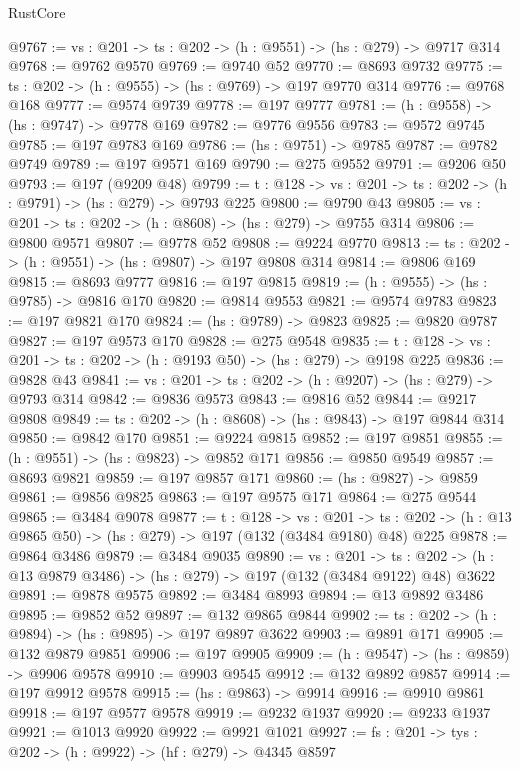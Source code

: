 \begin{lexlean}{RustCore}
\begin{coremodule}
@9767 := {vs : @201} -> {ts : @202} -> (h : @9551) -> (hs : @279) -> @9717 @314
@9768 := @9762 @9570
@9769 := @9740 @52
@9770 := @8693 @9732
@9775 := {ts : @202} -> (h : @9555) -> (hs : @9769) -> @197 @9770 @314
@9776 := @9768 @168
@9777 := @9574 @9739
@9778 := @197 @9777
@9781 := (h : @9558) -> (hs : @9747) -> @9778 @169
@9782 := @9776 @9556
@9783 := @9572 @9745
@9785 := @197 @9783 @169
@9786 := (hs : @9751) -> @9785
@9787 := @9782 @9749
@9789 := @197 @9571 @169
@9790 := @275 @9552
@9791 := @9206 @50
@9793 := @197 (@9209 @48)
@9799 := {t : @128} -> {vs : @201} -> {ts : @202} -> (h : @9791) -> (hs : @279) -> @9793 @225
@9800 := @9790 @43
@9805 := {vs : @201} -> {ts : @202} -> (h : @8608) -> (hs : @279) -> @9755 @314
@9806 := @9800 @9571
@9807 := @9778 @52
@9808 := @9224 @9770
@9813 := {ts : @202} -> (h : @9551) -> (hs : @9807) -> @197 @9808 @314
@9814 := @9806 @169
@9815 := @8693 @9777
@9816 := @197 @9815
@9819 := (h : @9555) -> (hs : @9785) -> @9816 @170
@9820 := @9814 @9553
@9821 := @9574 @9783
@9823 := @197 @9821 @170
@9824 := (hs : @9789) -> @9823
@9825 := @9820 @9787
@9827 := @197 @9573 @170
@9828 := @275 @9548
@9835 := {t : @128} -> {vs : @201} -> {ts : @202} -> (h : @9193 @50) -> (hs : @279) -> @9198 @225
@9836 := @9828 @43
@9841 := {vs : @201} -> {ts : @202} -> (h : @9207) -> (hs : @279) -> @9793 @314
@9842 := @9836 @9573
@9843 := @9816 @52
@9844 := @9217 @9808
@9849 := {ts : @202} -> (h : @8608) -> (hs : @9843) -> @197 @9844 @314
@9850 := @9842 @170
@9851 := @9224 @9815
@9852 := @197 @9851
@9855 := (h : @9551) -> (hs : @9823) -> @9852 @171
@9856 := @9850 @9549
@9857 := @8693 @9821
@9859 := @197 @9857 @171
@9860 := (hs : @9827) -> @9859
@9861 := @9856 @9825
@9863 := @197 @9575 @171
@9864 := @275 @9544
@9865 := @3484 @9078
@9877 := {t : @128} ->
  {vs : @201} ->
  {ts : @202} -> (h : @13 @9865 @50) -> (hs : @279) -> @197 (@132 (@3484 @9180) @48) @225
@9878 := @9864 @3486
@9879 := @3484 @9035
@9890 := {vs : @201} ->
  {ts : @202} -> (h : @13 @9879 @3486) -> (hs : @279) -> @197 (@132 (@3484 @9122) @48) @3622
@9891 := @9878 @9575
@9892 := @3484 @8993
@9894 := @13 @9892 @3486
@9895 := @9852 @52
@9897 := @132 @9865 @9844
@9902 := {ts : @202} -> (h : @9894) -> (hs : @9895) -> @197 @9897 @3622
@9903 := @9891 @171
@9905 := @132 @9879 @9851
@9906 := @197 @9905
@9909 := (h : @9547) -> (hs : @9859) -> @9906 @9578
@9910 := @9903 @9545
@9912 := @132 @9892 @9857
@9914 := @197 @9912 @9578
@9915 := (hs : @9863) -> @9914
@9916 := @9910 @9861
@9918 := @197 @9577 @9578
@9919 := @9232 @1937
@9920 := @9233 @1937
@9921 := @1013 @9920
@9922 := @9921 @1021
@9927 := {fs : @201} -> {tys : @202} -> (h : @9922) -> (hf : @279) -> @4345 @8597

\end{coremodule}
\end{lexlean}
